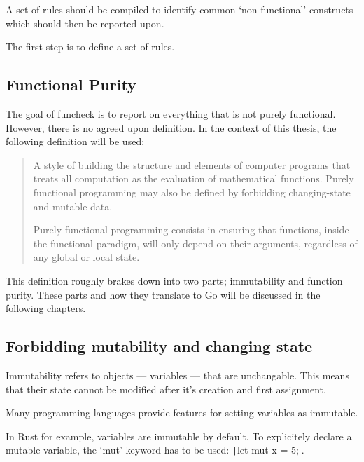 A set of rules should be compiled to identify common `non-functional' constructs
which should then be reported upon.

The first step is to define a set of rules.

\subsection{Functional Purity}

The goal of funcheck is to report on everything that is not purely
functional. However, there is no agreed upon definition\autocite{functional-controversy}.
In the context of this thesis, the following definition will be used:

\begin{quote}
    A style of building the structure and elements of computer programs that
    treats all computation as the evaluation of mathematical functions. Purely
    functional programming may also be defined by forbidding changing-state and
    mutable data.

    Purely functional programming consists in ensuring that functions, inside
    the functional paradigm, will only depend on their arguments, regardless of
    any global or local state.\autocite{functional-purity-wiki}
\end{quote}

This definition roughly brakes down into two parts; immutability and function
purity. These parts and how they translate to Go will be discussed in the
following chapters.

\subsection{Forbidding mutability and changing state}\label{sec:mutability}


Immutability refers to objects --- variables --- that are unchangable. This means
that their state cannot be modified after it's creation and first assignment.

Many programming languages provide features for setting variables as immutable.

In Rust for example, variables are immutable by default. To explicitely declare
a mutable variable, the `mut' keyword has to be used: \texttt|let mut x = 5;|.

